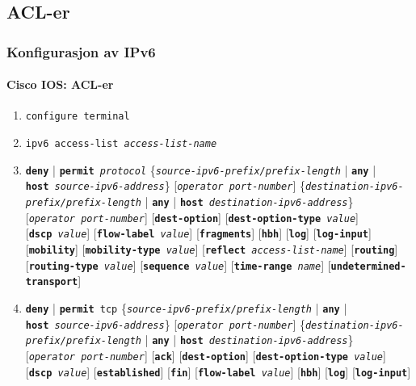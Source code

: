 \subsection{ACL-er}
\begin{frame}[allowframebreaks]
  \frametitle{Konfigurasjon av IPv6}
  \framesubtitle{Cisco IOS: ACL-er}
  \begin{enumerate}%
  \item \texttt{configure terminal}
  \item \texttt{ipv6 access-list \textit{access-list-name}}
  \item \texttt{\textbf{deny}} | \texttt{\textbf{permit}
      \textit{protocol}}
    \{\texttt{\textit{source-ipv6-prefix/prefix-length}} |
    \texttt{\textbf{any}} |
    \texttt{\textbf{host}~\textit{source-ipv6-address}}\}
    [\texttt{\textit{operator~port-number}}]
    \{\texttt{\textit{destination-ipv6-prefix/prefix-length}} |
    \texttt{\textbf{any}} |
    \texttt{\textbf{host}~\textit{destination-ipv6-address}}\}
    [\texttt{\textit{operator~port-number}}]
    [\texttt{\textbf{dest-option}}]
    [\texttt{\textbf{dest-option-type}~\textit{value}}]
    [\texttt{\textbf{dscp}~\textit{value}}]
    [\texttt{\textbf{flow-label}~\textit{value}}]
    [\texttt{\textbf{fragments}}]
    [\texttt{\textbf{hbh}}]
    [\texttt{\textbf{log}}]
    [\texttt{\textbf{log-input}}]
    [\texttt{\textbf{mobility}}]
    [\texttt{\textbf{mobility-type}~\textit{value}}]
    [\texttt{\textbf{reflect}~\textit{access-list-name}}]
    [\texttt{\textbf{routing}}]
    [\texttt{\textbf{routing-type}~\textit{value}}]
    [\texttt{\textbf{sequence}~\textit{value}}]
    [\texttt{\textbf{time-range}~\textit{name}}]
    [\texttt{\textbf{undetermined-transport}}]
  \item \texttt{\textbf{deny}} | \texttt{\textbf{permit} tcp}
    \{\texttt{\textit{source-ipv6-prefix/prefix-length}} |
    \texttt{\textbf{any}} |
    \texttt{\textbf{host}~\textit{source-ipv6-address}}\}
    [\texttt{\textit{operator~port-number}}]
    \{\texttt{\textit{destination-ipv6-prefix/prefix-length}} |
    \texttt{\textbf{any}} |
    \texttt{\textbf{host}~\textit{destination-ipv6-address}}\}
    [\texttt{\textit{operator~port-number}}]
    [\texttt{\textbf{ack}}]
    [\texttt{\textbf{dest-option}}]
    [\texttt{\textbf{dest-option-type}~\textit{value}}]
    [\texttt{\textbf{dscp}~\textit{value}}]
    [\texttt{\textbf{established}}]
    [\texttt{\textbf{fin}}]
    [\texttt{\textbf{flow-label}~\textit{value}}]
    [\texttt{\textbf{hbh}}]
    [\texttt{\textbf{log}}]
    [\texttt{\textbf{log-input}}]

\end{enumerate}
\end{frame}
